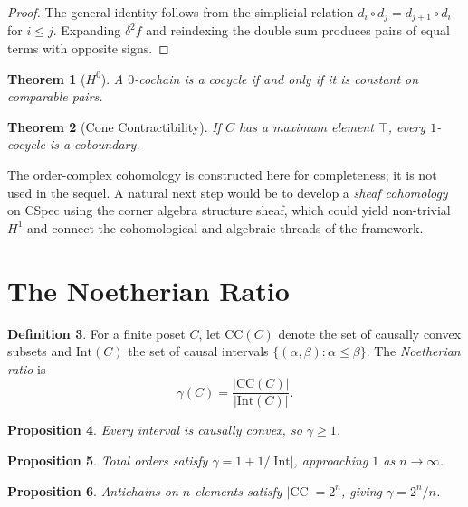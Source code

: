 \documentclass[11pt,a4paper]{article}
\theoremstyle{plain}
\newtheorem{theorem}{Theorem}[section]
\newtheorem{proposition}[theorem]{Proposition}
\theoremstyle{definition}
\newtheorem{definition}[theorem]{Definition}
\theoremstyle{remark}
\newcommand{\CSpec}{\mathrm{CSpec}}
\newcommand{\CC}{\mathrm{CC}}
\newcommand{\Int}{\mathrm{Int}}
\begin{document}
\begin{proof}
The general identity follows from the simplicial relation $d_i \circ d_j = d_{j+1} \circ d_i$ for $i \leq j$.
Expanding $\delta^2 f$ and reindexing the double sum produces pairs of equal terms with opposite signs.
\end{proof}

\begin{theorem}[$H^0$]
A $0$-cochain is a cocycle if and only if it is constant on comparable pairs.
\end{theorem}

\begin{theorem}[Cone Contractibility]
If $C$ has a maximum element $\top$, every $1$-cocycle is a coboundary.
\end{theorem}

\noindent The order-complex cohomology is constructed here for completeness; it is not used in the sequel.
A natural next step would be to develop a \emph{sheaf cohomology} on $\CSpec$ using the corner algebra structure sheaf, which could yield non-trivial $H^1$ and connect the cohomological and algebraic threads of the framework.


\section{The Noetherian Ratio}\label{sec:gamma}

\begin{definition}
For a finite poset $C$, let $\CC(C)$ denote the set of causally convex subsets and $\Int(C)$ the set of causal intervals $\{(\alpha,\beta) : \alpha \leq \beta\}$.
The \emph{Noetherian ratio} is
\[
\gamma(C) = \frac{|\CC(C)|}{|\Int(C)|}.
\]
\end{definition}

\begin{proposition}
Every interval is causally convex, so $\gamma \geq 1$.
\end{proposition}

\begin{proposition}
Total orders satisfy $\gamma = 1 + 1/|\Int|$, approaching $1$ as $n \to \infty$.
\end{proposition}

\begin{proposition}
Antichains on $n$ elements satisfy $|\CC| = 2^n$, giving $\gamma = 2^n / n$.
\end{proposition}
\end{document}

